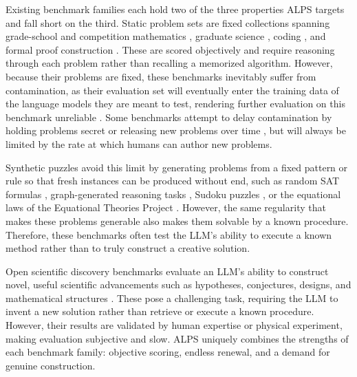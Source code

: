 \documentclass[letterpaper]{article} %
\begin{document}
Existing benchmark families each hold two of the three properties ALPS targets and fall short on the third. Static problem sets are fixed collections spanning grade-school and competition mathematics \citep{cobbe2021training, hendrycks2021measuring}, graduate science \citep{rein2023gpqa}, coding \citep{chen2021evaluating}, and formal proof construction \citep{zheng2021minif2f, azerbayev2023proofnet, tsoukalas2024putnambench}. These are scored objectively and require reasoning through each problem rather than recalling a memorized algorithm. However, because their problems are fixed, these benchmarks inevitably suffer from contamination, as their evaluation set will eventually enter the training data of the language models they are meant to test, rendering further evaluation on this benchmark unreliable \citep{xu2024benchmark, chen2025recent}. Some benchmarks attempt to delay contamination by holding problems secret \citep{glazer2024frontiermath} or releasing new problems over time \citep{white2025livebench, jain2025livecodebench}, but will always be limited by the rate at which humans can author new problems.

Synthetic puzzles avoid this limit by generating problems from a fixed pattern or rule so that fresh instances can be produced without end, such as random SAT formulas \citep{selman1996generating}, graph-generated reasoning tasks \citep{zhu2024dyval}, Sudoku puzzles \citep{seely2025sudoku}, or the equational laws of the Equational Theories Project \citep{bolan2025equational}. However, the same regularity that makes these problems generable also makes them solvable by a known procedure. Therefore, these benchmarks often test the LLM's ability to execute a known method rather than to truly construct a creative solution. 

Open scientific discovery benchmarks evaluate an LLM's ability to construct novel, useful scientific advancements such as hypotheses, conjectures, designs, and mathematical structures \citep{lu2024ai, gottweis2026accelerating, alkan2025survey, romera2024mathematical, merchant2023scaling, jumper2021highly}. These pose a challenging task, requiring the LLM to invent a new solution rather than retrieve or execute a known procedure. However, their results are validated by human expertise or physical experiment, making evaluation subjective and slow. ALPS uniquely combines the strengths of each benchmark family: objective scoring, endless renewal, and a demand for genuine construction.
\end{document}

